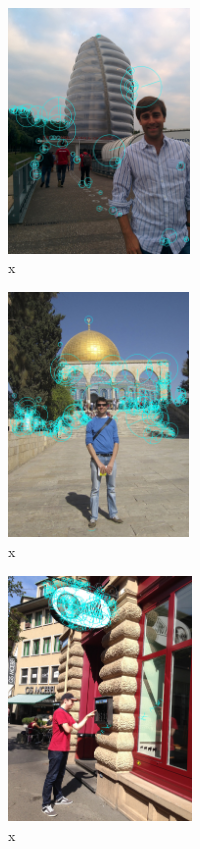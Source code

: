 \documentclass[runningheads]{llncs}
\begin{document}
\begin{figure} \centering \includegraphics[height=6.5cm]{images/mansfield.jpg}
\caption{x} \label{fig:example} \end{figure}

\begin{figure} \centering \includegraphics[height=6.5cm]{images/nater.jpg}
\caption{x} \label{fig:example} \end{figure}

\begin{figure} \centering \includegraphics[height=6.5cm]{images/russ.jpg}
\caption{x} \label{fig:example} \end{figure}
\end{document}
